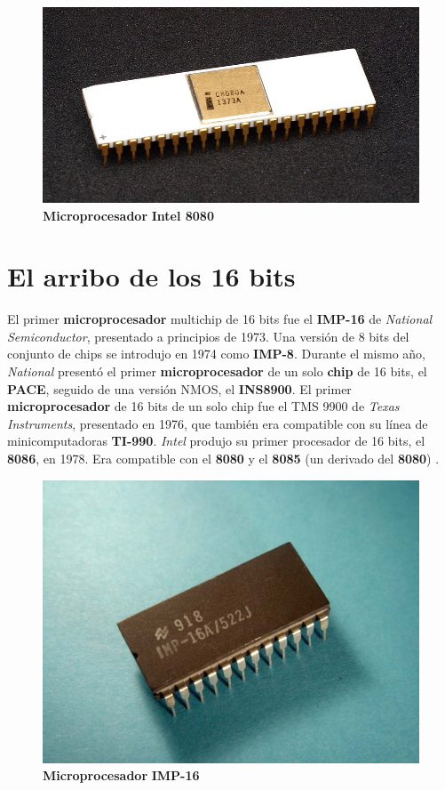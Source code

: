 \begin{figure}[htb]
	\centering
	\includegraphics[scale = 0.2]{Graphics/8080_microprocessorr.jpg}
	\caption{\textbf{Microprocesador} \textbf{Intel 8080}}
	\label{fig:14}
\end{figure}

\section{El arribo de los 16 bits}
El primer \textbf{microprocesador} multichip de 16 bits fue el \textbf{IMP-16} de \emph{National Semiconductor}, presentado a principios de
1973. Una versión de 8 bits del conjunto de chips se introdujo en 1974 como \textbf{IMP-8}. Durante el mismo año, \emph{National} presentó
el primer \textbf{microprocesador} de un solo \textbf{chip} de 16 bits, el \textbf{PACE}, seguido de una versión NMOS, el \textbf{INS8900}.
El primer \textbf{microprocesador} de 16 bits de un solo chip fue el TMS 9900 de \emph{Texas Instruments}, presentado en 1976, que también
era compatible con su línea de minicomputadoras \textbf{TI-990}. \emph{Intel} produjo su primer procesador de 16 bits, el \textbf{8086},
en 1978. Era compatible con el \textbf{8080} y el \textbf{8085} (un derivado del \textbf{8080}) .

\begin{figure}[htb]
	\centering
	\includegraphics[scale = 0.2]{Graphics/NSIMP-16A.jpg}
	\caption{\textbf{Microprocesador} \textbf{IMP-16}}
	\label{fig:15}
\end{figure}

